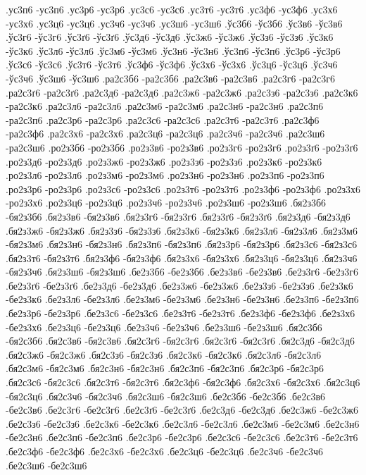 {.ус3п6 -ус3п6
.ус3р6 -ус3р6
.ус3с6 -ус3с6
.ус3т6 -ус3т6
.ус3ф6 -ус3ф6
.ус3х6 -ус3х6
.ус3ц6 -ус3ц6
.ус3ч6 -ус3ч6
.ус3ш6 -ус3ш6
.ўс3б6 -ўс3б6
.ўс3в6 -ўс3в6
.ўс3г6 -ўс3г6
.ўс3ґ6 -ўс3ґ6
.ўс3д6 -ўс3д6
.ўс3ж6 -ўс3ж6
.ўс3з6 -ўс3з6
.ўс3к6 -ўс3к6
.ўс3л6 -ўс3л6
.ўс3м6 -ўс3м6
.ўс3н6 -ўс3н6
.ўс3п6 -ўс3п6
.ўс3р6 -ўс3р6
.ўс3с6 -ўс3с6
.ўс3т6 -ўс3т6
.ўс3ф6 -ўс3ф6
.ўс3х6 -ўс3х6
.ўс3ц6 -ўс3ц6
.ўс3ч6 -ўс3ч6
.ўс3ш6 -ўс3ш6
.ра2с3б6 -ра2с3б6
.ра2с3в6 -ра2с3в6
.ра2с3г6 -ра2с3г6
.ра2с3ґ6 -ра2с3ґ6
.ра2с3д6 -ра2с3д6
.ра2с3ж6 -ра2с3ж6
.ра2с3з6 -ра2с3з6
.ра2с3к6 -ра2с3к6
.ра2с3л6 -ра2с3л6
.ра2с3м6 -ра2с3м6
.ра2с3н6 -ра2с3н6
.ра2с3п6 -ра2с3п6
.ра2с3р6 -ра2с3р6
.ра2с3с6 -ра2с3с6
.ра2с3т6 -ра2с3т6
.ра2с3ф6 -ра2с3ф6
.ра2с3х6 -ра2с3х6
.ра2с3ц6 -ра2с3ц6
.ра2с3ч6 -ра2с3ч6
.ра2с3ш6 -ра2с3ш6
.ро2з3б6 -ро2з3б6
.ро2з3в6 -ро2з3в6
.ро2з3г6 -ро2з3г6
.ро2з3ґ6 -ро2з3ґ6
.ро2з3д6 -ро2з3д6
.ро2з3ж6 -ро2з3ж6
.ро2з3з6 -ро2з3з6
.ро2з3к6 -ро2з3к6
.ро2з3л6 -ро2з3л6
.ро2з3м6 -ро2з3м6
.ро2з3н6 -ро2з3н6
.ро2з3п6 -ро2з3п6
.ро2з3р6 -ро2з3р6
.ро2з3с6 -ро2з3с6
.ро2з3т6 -ро2з3т6
.ро2з3ф6 -ро2з3ф6
.ро2з3х6 -ро2з3х6
.ро2з3ц6 -ро2з3ц6
.ро2з3ч6 -ро2з3ч6
.ро2з3ш6 -ро2з3ш6
.бя2з3б6 -бя2з3б6
.бя2з3в6 -бя2з3в6
.бя2з3г6 -бя2з3г6
.бя2з3ґ6 -бя2з3ґ6
.бя2з3д6 -бя2з3д6
.бя2з3ж6 -бя2з3ж6
.бя2з3з6 -бя2з3з6
.бя2з3к6 -бя2з3к6
.бя2з3л6 -бя2з3л6
.бя2з3м6 -бя2з3м6
.бя2з3н6 -бя2з3н6
.бя2з3п6 -бя2з3п6
.бя2з3р6 -бя2з3р6
.бя2з3с6 -бя2з3с6
.бя2з3т6 -бя2з3т6
.бя2з3ф6 -бя2з3ф6
.бя2з3х6 -бя2з3х6
.бя2з3ц6 -бя2з3ц6
.бя2з3ч6 -бя2з3ч6
.бя2з3ш6 -бя2з3ш6
.бе2з3б6 -бе2з3б6
.бе2з3в6 -бе2з3в6
.бе2з3г6 -бе2з3г6
.бе2з3ґ6 -бе2з3ґ6
.бе2з3д6 -бе2з3д6
.бе2з3ж6 -бе2з3ж6
.бе2з3з6 -бе2з3з6
.бе2з3к6 -бе2з3к6
.бе2з3л6 -бе2з3л6
.бе2з3м6 -бе2з3м6
.бе2з3н6 -бе2з3н6
.бе2з3п6 -бе2з3п6
.бе2з3р6 -бе2з3р6
.бе2з3с6 -бе2з3с6
.бе2з3т6 -бе2з3т6
.бе2з3ф6 -бе2з3ф6
.бе2з3х6 -бе2з3х6
.бе2з3ц6 -бе2з3ц6
.бе2з3ч6 -бе2з3ч6
.бе2з3ш6 -бе2з3ш6
.бя2с3б6 -бя2с3б6
.бя2с3в6 -бя2с3в6
.бя2с3г6 -бя2с3г6
.бя2с3ґ6 -бя2с3ґ6
.бя2с3д6 -бя2с3д6
.бя2с3ж6 -бя2с3ж6
.бя2с3з6 -бя2с3з6
.бя2с3к6 -бя2с3к6
.бя2с3л6 -бя2с3л6
.бя2с3м6 -бя2с3м6
.бя2с3н6 -бя2с3н6
.бя2с3п6 -бя2с3п6
.бя2с3р6 -бя2с3р6
.бя2с3с6 -бя2с3с6
.бя2с3т6 -бя2с3т6
.бя2с3ф6 -бя2с3ф6
.бя2с3х6 -бя2с3х6
.бя2с3ц6 -бя2с3ц6
.бя2с3ч6 -бя2с3ч6
.бя2с3ш6 -бя2с3ш6
.бе2с3б6 -бе2с3б6
.бе2с3в6 -бе2с3в6
.бе2с3г6 -бе2с3г6
.бе2с3ґ6 -бе2с3ґ6
.бе2с3д6 -бе2с3д6
.бе2с3ж6 -бе2с3ж6
.бе2с3з6 -бе2с3з6
.бе2с3к6 -бе2с3к6
.бе2с3л6 -бе2с3л6
.бе2с3м6 -бе2с3м6
.бе2с3н6 -бе2с3н6
.бе2с3п6 -бе2с3п6
.бе2с3р6 -бе2с3р6
.бе2с3с6 -бе2с3с6
.бе2с3т6 -бе2с3т6
.бе2с3ф6 -бе2с3ф6
.бе2с3х6 -бе2с3х6
.бе2с3ц6 -бе2с3ц6
.бе2с3ч6 -бе2с3ч6
.бе2с3ш6 -бе2с3ш6
}
